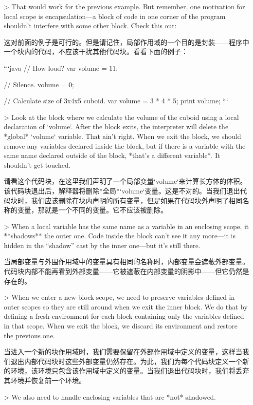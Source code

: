 \documentclass[cn,11pt,chinese]{elegantbook}
\begin{document}
{{{{{> That would work for the previous example. But remember, one motivation for local scope is encapsulation—a block of code in one corner of the program shouldn’t interfere with some other block. Check this out:

这对前面的例子是可行的。但是请记住，局部作用域的一个目的是封装——程序中一个块内的代码，不应该干扰其他代码块。看看下面的例子：

```java
// How loud?
var volume = 11;

// Silence.
volume = 0;

// Calculate size of 3x4x5 cuboid.
{
  var volume = 3 * 4 * 5;
  print volume;
}
```

> Look at the block where we calculate the volume of the cuboid using a local declaration of `volume`. After the block exits, the interpreter will delete the *global* `volume` variable. That ain’t right. When we exit the block, we should remove any variables declared inside the block, but if there is a variable with the same name declared outside of the block, *that’s a different variable*. It shouldn’t get touched.

请看这个代码块，在这里我们声明了一个局部变量`volume`来计算长方体的体积。该代码块退出后，解释器将删除*全局*`volume`变量。这是不对的。当我们退出代码块时，我们应该删除在块内声明的所有变量，但是如果在代码块外声明了相同名称的变量，那就是一个不同的变量。它不应该被删除。

> When a local variable has the same name as a variable in an enclosing scope, it **shadows** the outer one. Code inside the block can’t see it any more—it is hidden in the “shadow” cast by the inner one—but it’s still there.

当局部变量与外围作用域中的变量具有相同的名称时，内部变量会遮蔽外部变量。代码块内部不能再看到外部变量——它被遮蔽在内部变量的阴影中——但它仍然是存在的。

> When we enter a new block scope, we need to preserve variables defined in outer scopes so they are still around when we exit the inner block. We do that by defining a fresh environment for each block containing only the variables defined in that scope. When we exit the block, we discard its environment and restore the previous one.

当进入一个新的块作用域时，我们需要保留在外部作用域中定义的变量，这样当我们退出内部代码块时这些外部变量仍然存在。为此，我们为每个代码块定义一个新的环境，该环境只包含该作用域中定义的变量。当我们退出代码块时，我们将丢弃其环境并恢复前一个环境。

> We also need to handle enclosing variables that are *not* shadowed.

}}}}}
\end{document}
